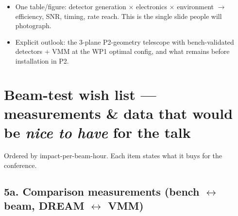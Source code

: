 \documentclass[11pt,a4paper]{article}
\begin{document}
\begin{itemize}[itemsep=1pt]
  \item One table/figure: detector generation $\times$ electronics $\times$
    environment $\rightarrow$ efficiency, SNR, timing, rate reach. This is the
    single slide people will photograph.
  \item Explicit outlook: the 3-plane P2-geometry telescope with
    bench-validated detectors + VMM at the WP1 optimal config, and what
    remains before installation in P2.
\end{itemize}

\section{Beam-test wish list --- measurements \& data that would be
  \emph{nice to have} for the talk}
\label{sec:wishlist}

Ordered by impact-per-beam-hour. Each item states what it buys for the
conference.

\subsection*{5a. Comparison measurements (bench $\leftrightarrow$ beam, DREAM $\leftrightarrow$ VMM)}
\end{document}
